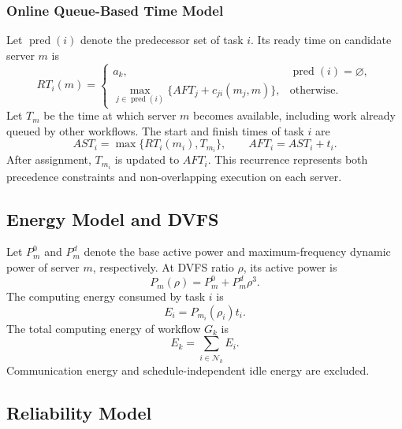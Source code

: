 \documentclass[lettersize,journal]{IEEEtran}
\begin{document}
\subsubsection{Online Queue-Based Time Model}
Let $\operatorname{pred}(i)$ denote the predecessor set of task $i$. Its ready
time on candidate server $m$ is
\begin{equation}
    RT_i(m)=
    \begin{cases}
        a_k, & \operatorname{pred}(i)=\varnothing,\\[3pt]
        \displaystyle\max_{j\in\operatorname{pred}(i)}
        \{AFT_j+c_{ji}(m_j,m)\}, & \text{otherwise}.
    \end{cases}
    \label{eq:ready_time}
\end{equation}
Let $T_m$ be the time at which server $m$ becomes available, including work
already queued by other workflows. The start and finish times of task $i$ are
\begin{equation}
    AST_i=\max\{RT_i(m_i),T_{m_i}\},
    \qquad
    AFT_i=AST_i+t_i.
    \label{eq:task_times}
\end{equation}
After assignment, $T_{m_i}$ is updated to $AFT_i$. This recurrence represents
both precedence constraints and non-overlapping execution on each server.

\subsection{Energy Model and DVFS}
\label{sec:energy_model}

Let $P_m^0$ and $P_m^d$ denote the base active power and
maximum-frequency dynamic power of server $m$, respectively. At DVFS ratio
$\rho$, its active power is
\begin{equation}
    P_m(\rho)=P_m^{0}+P_m^{d}\rho^3.
    \label{eq:power_model}
\end{equation}
The computing energy consumed by task $i$ is
\begin{equation}
    E_i=P_{m_i}(\rho_i)t_i.
    \label{eq:task_energy}
\end{equation}
The total computing energy of workflow $G_k$ is
\begin{equation}
    E_k=\sum_{i\in\mathcal{N}_k}E_i.
    \label{eq:total_energy}
\end{equation}
Communication energy and schedule-independent idle energy are excluded.

\subsection{Reliability Model}
\label{sec:reliability_model}
\end{document}
